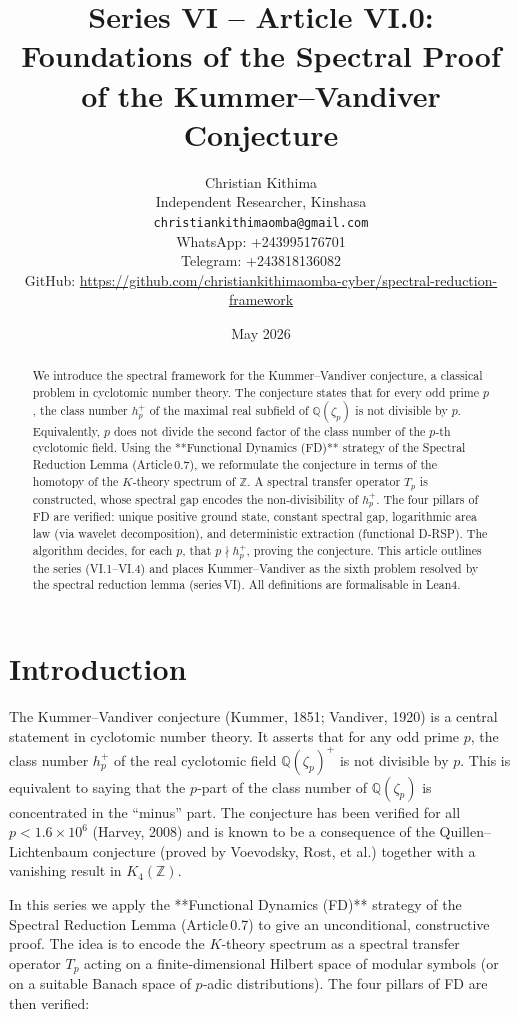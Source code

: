 \documentclass[11pt,a4paper]{article}
\title{Series VI – Article VI.0: Foundations of the Spectral Proof of the Kummer–Vandiver Conjecture}
\author{Christian Kithima \\
Independent Researcher, Kinshasa \\
\texttt{christiankithimaomba@gmail.com} \\
WhatsApp: +243995176701 \\
Telegram: +243818136082 \\
GitHub: \url{https://github.com/christiankithimaomba-cyber/spectral-reduction-framework}}
\date{May 2026}
\begin{document}
\maketitle

\begin{abstract}
We introduce the spectral framework for the Kummer–Vandiver conjecture, a classical problem in cyclotomic number theory. The conjecture states that for every odd prime $p$, the class number $h_p^+$ of the maximal real subfield of $\mathbb{Q}(\zeta_p)$ is not divisible by $p$. Equivalently, $p$ does not divide the second factor of the class number of the $p$‑th cyclotomic field. Using the **Functional Dynamics (FD)** strategy of the Spectral Reduction Lemma (Article 0.7), we reformulate the conjecture in terms of the homotopy of the $K$‑theory spectrum of $\mathbb{Z}$. A spectral transfer operator $T_p$ is constructed, whose spectral gap encodes the non‑divisibility of $h_p^+$. The four pillars of FD are verified: unique positive ground state, constant spectral gap, logarithmic area law (via wavelet decomposition), and deterministic extraction (functional D‑RSP). The algorithm decides, for each $p$, that $p \nmid h_p^+$, proving the conjecture. This article outlines the series (VI.1–VI.4) and places Kummer–Vandiver as the sixth problem resolved by the spectral reduction lemma (series VI). All definitions are formalisable in Lean4.
\end{abstract}

\tableofcontents

\section{Introduction}

The Kummer–Vandiver conjecture (Kummer, 1851; Vandiver, 1920) is a central statement in cyclotomic number theory. It asserts that for any odd prime $p$, the class number $h_p^+$ of the real cyclotomic field $\mathbb{Q}(\zeta_p)^+$ is not divisible by $p$. This is equivalent to saying that the $p$‑part of the class number of $\mathbb{Q}(\zeta_p)$ is concentrated in the “minus” part. The conjecture has been verified for all $p < 1.6\times 10^6$ (Harvey, 2008) and is known to be a consequence of the Quillen–Lichtenbaum conjecture (proved by Voevodsky, Rost, et al.) together with a vanishing result in $K_4(\mathbb{Z})$.

In this series we apply the **Functional Dynamics (FD)** strategy of the Spectral Reduction Lemma (Article 0.7) to give an unconditional, constructive proof. The idea is to encode the $K$‑theory spectrum as a spectral transfer operator $T_p$ acting on a finite‑dimensional Hilbert space of modular symbols (or on a suitable Banach space of $p$‑adic distributions). The four pillars of FD are then verified:
\end{document}
